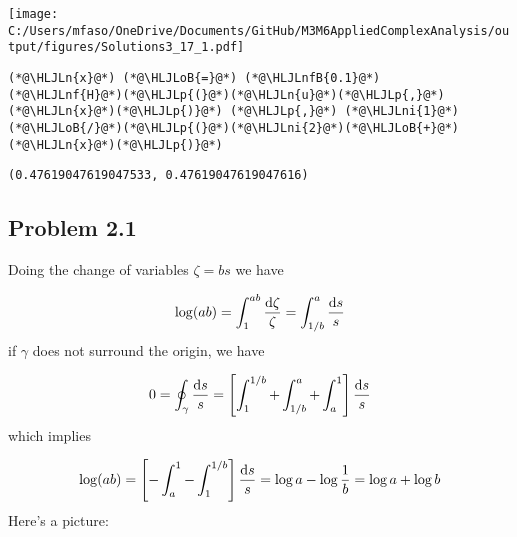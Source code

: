 \documentclass[12pt,a4paper]{article}
\newcommand{\HLJLn}[1]{#1}
\newcommand{\HLJLnf}[1]{\textcolor[RGB]{66,102,213}{#1}}
\newcommand{\HLJLnfB}[1]{\textcolor[RGB]{59,151,46}{#1}}
\newcommand{\HLJLni}[1]{\textcolor[RGB]{59,151,46}{#1}}
\newcommand{\HLJLoB}[1]{\textcolor[RGB]{102,102,102}{\textbf{#1}}}
\newcommand{\HLJLp}[1]{#1}
\def\D{ {\rm d} }
\begin{document}
\texttt{[image: C:/Users/mfaso/OneDrive/Documents/GitHub/M3M6AppliedComplexAnalysis/output/figures/Solutions3\_17\_1.pdf]}

\begin{lstlisting}
(*@\HLJLn{x}@*) (*@\HLJLoB{=}@*) (*@\HLJLnfB{0.1}@*)
(*@\HLJLnf{H}@*)(*@\HLJLp{(}@*)(*@\HLJLn{u}@*)(*@\HLJLp{,}@*)(*@\HLJLn{x}@*)(*@\HLJLp{)}@*) (*@\HLJLp{,}@*) (*@\HLJLni{1}@*)(*@\HLJLoB{/}@*)(*@\HLJLp{(}@*)(*@\HLJLni{2}@*)(*@\HLJLoB{+}@*)(*@\HLJLn{x}@*)(*@\HLJLp{)}@*)
\end{lstlisting}

\begin{lstlisting}
(0.47619047619047533, 0.47619047619047616)
\end{lstlisting}


\subsection{Problem 2.1}
Doing the change of variables $\zeta = b s$ we have

\[
\log(ab) = \int_1^{ab} {\D \zeta \over \zeta} = \int_{1/b}^a {\D s \over s}
\]
if $\gamma$ does not surround the origin, we have

\[
0 = \oint_\gamma {\D s \over s} = \left[\int_1^{1/b} + \int_{1/b}^a + \int_a^1\right] {\D s \over s}
\]
which implies

\[
\log(ab) = \left[-\int_a^1 -\int_1^{1/b} \right] {\D s \over s} = \log a - \log {1 \over b} = \log a + \log b
\]
Here's a picture:
\end{document}
